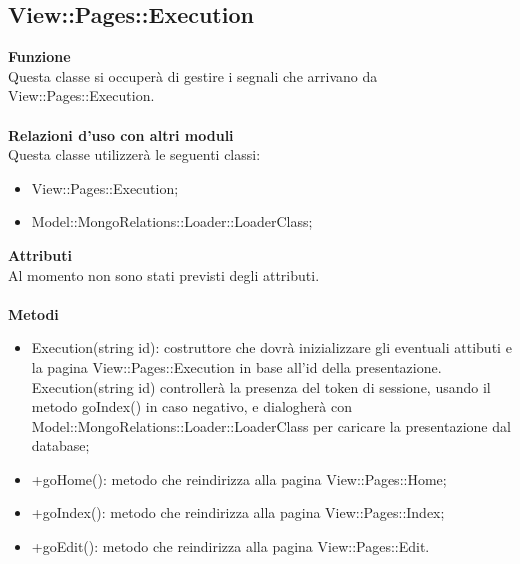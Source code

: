 {				\subsection{View::Pages::Execution}{
					\textbf{Funzione}\\
					\indent Questa classe si occuperà di gestire i segnali che arrivano da View::Pages::Execution.\\\\
					\textbf{Relazioni d'uso con altri moduli}\\
					\indent Questa classe utilizzerà le seguenti classi:
					\begin{itemize}
						\item View::Pages::Execution;
						\item Model::MongoRelations::Loader::LoaderClass;
					\end{itemize}
					\textbf{Attributi}\\
					\indent Al momento non sono stati previsti degli attributi.\\\\
					\textbf{Metodi}
					\begin{itemize}
						\item Execution(string id): costruttore che dovrà inizializzare gli eventuali attibuti e la pagina View::Pages::Execution in base all'id della presentazione. Execution(string id) controllerà la presenza del token di sessione, usando il metodo goIndex() in caso negativo, e dialogherà con Model::MongoRelations::Loader::LoaderClass per caricare la presentazione dal database;
						\item +goHome(): metodo che reindirizza alla pagina View::Pages::Home;
						\item +goIndex(): metodo che reindirizza alla pagina View::Pages::Index;
						\item +goEdit(): metodo che reindirizza alla pagina View::Pages::Edit.
					\end{itemize}
				}
}
